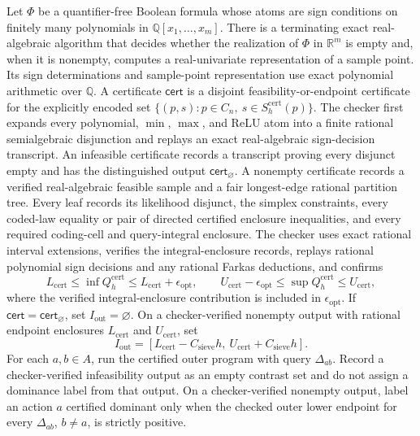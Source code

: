 Let \(\Phi\) be a quantifier-free Boolean formula whose atoms are sign conditions on finitely many polynomials in \(\mathbb Q[x_1,\ldots,x_m]\).  There is a terminating exact real-algebraic algorithm that decides whether the realization of \(\Phi\) in \(\mathbb R^m\) is empty and, when it is nonempty, computes a real-univariate representation of a sample point.  Its sign determinations and sample-point representation use exact polynomial arithmetic over \(\mathbb Q\).
A certificate \(\mathsf{cert}\) is a disjoint feasibility-or-endpoint certificate for the explicitly encoded set \(\{(p,s):p\in C_n,\ s\in S_h^{\mathrm{cert}}(p)\}\).  The checker first expands every polynomial, \(\min\), \(\max\), and ReLU atom into a finite rational semialgebraic disjunction and replays an exact real-algebraic sign-decision transcript.  An infeasible certificate records a transcript proving every disjunct empty and has the distinguished output \(\mathsf{cert}_{\varnothing}\).  A nonempty certificate records a verified real-algebraic feasible sample and a fair longest-edge rational partition tree.  Every leaf records its likelihood disjunct, the simplex constraints, every coded-law equality or pair of directed certified enclosure inequalities, and every required coding-cell and query-integral enclosure.  The checker uses exact rational interval extensions, verifies the integral-enclosure records, replays rational polynomial sign decisions and any rational Farkas deductions, and confirms
\[
L_{\mathrm{cert}}\leq\inf Q_h^{\mathrm{cert}}\leq L_{\mathrm{cert}}+\epsilon_{\mathrm{opt}},
\qquad
U_{\mathrm{cert}}-\epsilon_{\mathrm{opt}}\leq\sup Q_h^{\mathrm{cert}}\leq U_{\mathrm{cert}},
\]
where the verified integral-enclosure contribution is included in \(\epsilon_{\mathrm{opt}}\).
If \(\mathsf{cert}=\mathsf{cert}_{\varnothing}\), set \(I_{\mathrm{out}}=\varnothing\).  On a checker-verified nonempty output with rational endpoint enclosures \(L_{\mathrm{cert}}\) and \(U_{\mathrm{cert}}\), set
\[
I_{\mathrm{out}}=[L_{\mathrm{cert}}-C_{\mathrm{sieve}}h,\ U_{\mathrm{cert}}+C_{\mathrm{sieve}}h].
\]
For each \(a,b\in A\), run the certified outer program with query \(\Delta_{ab}\).  Record a checker-verified infeasibility output as an empty contrast set and do not assign a dominance label from that output.  On a checker-verified nonempty output, label an action \(a\) certified dominant only when the checked outer lower endpoint for every \(\Delta_{ab}\), \(b\ne a\), is strictly positive.
